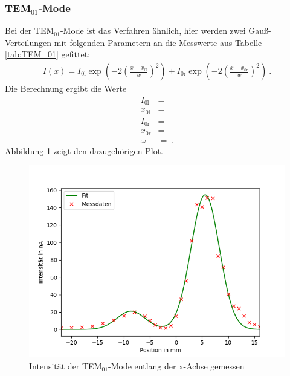 \subsubsection{TEM$_{01}$-Mode}
Bei der TEM$_{01}$-Mode ist das Verfahren ähnlich, hier werden zwei Gauß-Verteilungen mit folgenden Parametern an die Messwerte aus Tabelle \ref{tab:TEM_01} gefittet:
\begin{align*}
	I(x) = I_\text{0l}\exp\left(-2\left(\frac{x+x_\text{0l}}{w}\right)^2\right) + I_\text{0r}\exp\left(-2\left(\frac{x+x_\text{0r}}{w}\right)^2\right) \ .
\end{align*}
Die Berechnung ergibt die Werte
\begin{align}
	I_\text{0l} &=  \\
	x_\text{0l} &=  \\
	I_\text{0r} &=   \\
	x_\text{0r} &=  \\
	\omega &=   \ .
\end{align}
Abbildung \ref{fig:TEM_01} zeigt den dazugehörigen Plot.
\begin{figure}[h!]
	\centering
	\includegraphics[width=.7\textwidth]{build/TEM_01.png}
	\caption{Intensität der TEM$_{01}$-Mode entlang der x-Achse gemessen}
	\label{fig:TEM_01}
\end{figure}


